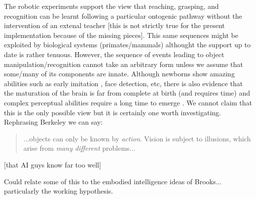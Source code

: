 The robotic experiments support the view that reaching, grasping, and recognition
can be learnt following a particular ontogenic pathway without the
intervention of an extenal teacher [this is not strictly true for
the present implementation because of the missing pieces].
This same sequences might be exploited by biological systems (primates/mammals)
althought the support up to date is rather tenuous. However, the 
sequence of events leading to object manipulation/recognition cannot take
an arbitrary form unless we assume that some/many of its components are innate.
Although newborns show amazing abilities \cite{spelke-2000} such as early imitation 
\cite{meltzoff-moore-1977}, face detection, etc, there is also evidence 
that the maturation of the brain is far from complete at birth (and requires time) and
complex perceptual abilities require a long time to emerge \cite{kovacs00human}.
We cannot claim that this is the only possible view but it is certainly one worth
investigating. Rephrasing Berkeley we can say:
\begin{quote}
...objects can only be known by
\emph{action}. Vision is subject to illusions, 
which arise from \emph{many different} problems...
\end{quote}
[that AI guys know far too well]





Could relate some of this to the embodied intelligence ideas
of Brooks... particularly the working hypothesis.

